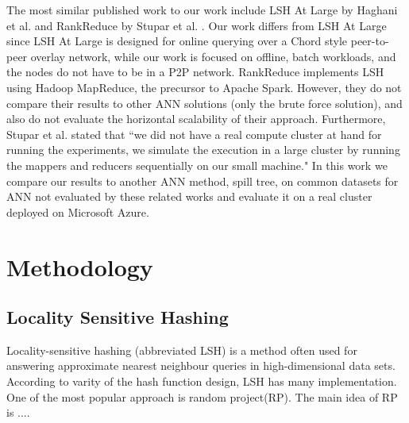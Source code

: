 \documentclass[letterpaper,twocolumn,10pt]{article}
\theoremstyle{definition}
\begin{document}
The most similar published work to our work include LSH At Large by Haghani et al. 
\cite{haghani2008lsh} and RankReduce by Stupar et al. \cite{stupar2010rankreduce}. 
Our work differs from LSH At Large since LSH At Large is designed for online 
querying over a Chord style peer-to-peer overlay network, while our work is focused 
on offline, batch workloads, and the nodes do not have to be in a P2P network. 
RankReduce implements LSH using Hadoop MapReduce, the precursor to Apache Spark. 
However, they do not compare their results to other ANN solutions (only the brute 
force solution), and also do not evaluate the horizontal scalability of their 
approach. Furthermore, Stupar et al. stated that ``we did not have a real compute 
cluster at hand for running the experiments, we simulate the execution in a large 
cluster by running the mappers and reducers sequentially on our small machine." In 
this work we compare our results to another ANN method, spill tree, on common 
datasets for ANN not evaluated by these related works and evaluate it 
on a real cluster deployed on Microsoft Azure.


\section{Methodology}



\subsection{Locality Sensitive Hashing}
Locality-sensitive hashing (abbreviated LSH) is a method often used for answering approximate nearest neighbour queries in high-dimensional data sets. According to varity of the hash function design, LSH has many implementation. One of the most popular approach is random project(RP). The main idea of RP is .... \cite{wang2014hashing}  
\end{document}
